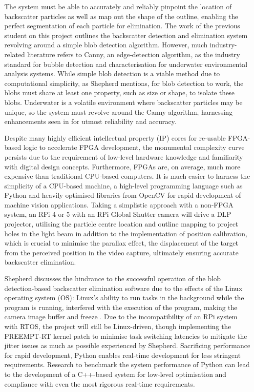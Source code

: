 The system must be able to accurately and reliably pinpoint the location of backscatter particles as well as map out the shape of the outline, enabling the perfect segmentation of each particle for elimination. The work of the previous student on this project \cite{katieshepherdMachineVisionBased2023} outlines the backscatter detection and elimination system revolving around a simple blob detection algorithm. However, much industry-related literature refers to Canny, an edge-detection algorithm, as the industry standard for bubble detection and characterisation for underwater environmental analysis systems. While simple blob detection is a viable method due to computational simplicity, as Shepherd mentions, for blob detection to work, the blobs must share at least one property, such as size or shape, to isolate these blobs. Underwater is a volatile environment where backscatter particles may be unique, so the system must revolve around the Canny algorithm, harnessing enhancements seen in \cite{zelenkaGasBubbleShape2014} for utmost reliability and accuracy.

Despite many highly efficient intellectual property (IP) cores for re-usable FPGA-based logic to accelerate FPGA development, the monumental complexity curve persists due to the requirement of low-level hardware knowledge and familiarity with digital design concepts. Furthermore, FPGAs are, on average, much more expensive than traditional CPU-based computers. It is much easier to harness the simplicity of a CPU-based machine, a high-level programming language such as Python and heavily optimised libraries from OpenCV for rapid development of machine vision applications. Taking a simplistic approach with a non-FPGA system, an RPi 4 or 5 with an RPi Global Shutter camera will drive a DLP projector, utilising the particle centre location and outline mapping to project holes in the light beam in addition to the implementation of position calibration, which is crucial to minimise the parallax effect, the displacement of the target from the perceived position in the video capture, ultimately ensuring accurate backscatter elimination.

Shepherd discusses the hindrance to the successful operation of the blob detection-based backscatter elimination software due to the effects of the Linux operating system (OS): Linux's ability to run tasks in the background while the program is running, interfered with the execution of the program, making the camera image buffer and freeze \cite{katieshepherdMachineVisionBased2023}. Due to the incompatibility of an RPi system with RTOS, the project will still be Linux-driven, though implementing the PREEMPT-RT kernel patch to minimise task switching latencies to mitigate the jitter issues as much as possible experienced by Shepherd. Sacrificing performance for rapid development, Python enables real-time development for less stringent requirements. Research to benchmark the system performance of Python can lead to the development of a C++-based system for low-level optimisation and compliance with even the most rigorous real-time requirements.


